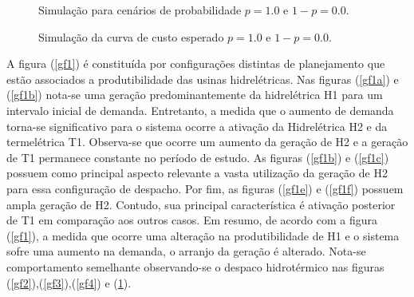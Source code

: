 \begin{figure}[!ht]
	\centering
	\caption{Simula\c c\~ao para cen\'arios de probabilidade $p = 1.0$ e $1 - p = 0.0$.}
	\label{gf5}
\end{figure}

\begin{figure}[!ht]
	\centering
	\caption{Simula\c c\~ao da curva de custo esperado $p = 1.0$ e $1 - p = 0.0$.}
	\label{cu5}
\end{figure}
\clearpage
A figura (\ref{gf1}) \'e constitu\'ida por configura\c c\~oes distintas de planejamento que est\~ao associados a produtibilidade das usinas
hidrel\'etricas. Nas figuras (\ref{gf1a}) e (\ref{gf1b}) nota-se uma gera\c c\~ao predominantemente da hidrel\'etrica H1
para um intervalo inicial de demanda.
Entretanto, a medida que o aumento de demanda torna-se significativo para o sistema ocorre a ativa\c c\~ao da Hidrel\'etrica H2
e da termel\'etrica T1. Observa-se que ocorre um aumento da gera\c c\~ao de H2 e a gera\c c\~ao de T1 permanece constante no per\'iodo de estudo.
As figuras (\ref{gf1b}) e (\ref{gf1c}) possuem como principal aspecto relevante a vasta utiliza\c c\~ao
da gera\c c\~ao de H2 para essa configura\c c\~ao de despacho. Por fim, as figuras (\ref{gf1e}) e (\ref{gf1f}) possuem ampla gera\c c\~ao de H2.
Contudo, sua principal caracter\'istica \'e ativa\c c\~ao posterior de T1 em compara\c c\~ao aos outros casos.
Em resumo, de acordo com a figura (\ref{gf1}), a medida que ocorre uma altera\c c\~ao na produtibilidade de H1
e o sistema sofre uma aumento na demanda, o arranjo da gera\c c\~ao \'e alterado. Nota-se comportamento semelhante
observando-se o despaco hidrot\'ermico nas figuras (\ref{gf2}),(\ref{gf3}),(\ref{gf4}) e (\ref{gf5}). 

